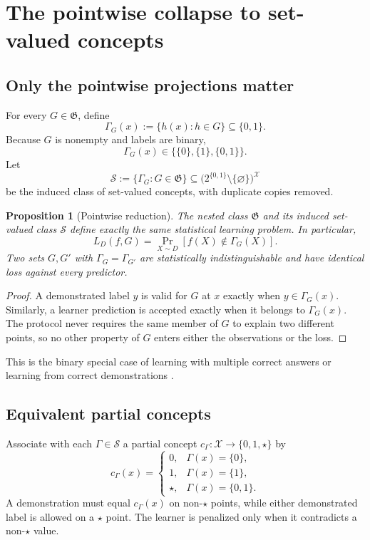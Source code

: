 \documentclass[11pt]{article}
\newtheorem{proposition}[theorem]{Proposition}
\theoremstyle{definition}
\theoremstyle{remark}
\newcommand{\X}{\mathcal X}
\newcommand{\Y}{\{0,1\}}
\newcommand{\Outer}{\mathfrak G}
\newcommand{\SV}{\mathcal S}
\newcommand{\1}{\mathbf 1}
\begin{document}
\section{The pointwise collapse to set-valued concepts}

\subsection{Only the pointwise projections matter}

For every $G\in\Outer$, define
\[
    \Gamma_G(x):=\{h(x):h\in G\}\subseteq\Y.
\]
Because $G$ is nonempty and labels are binary,
\[
    \Gamma_G(x)\in\bigl\{\{0\},\{1\},\{0,1\}\bigr\}.
\]
Let
\[
    \SV:=\{\Gamma_G:G\in\Outer\}
    \subseteq
    \bigl(2^{\Y}\setminus\{\varnothing\}\bigr)^{\X}
\]
be the induced class of set-valued concepts, with duplicate copies removed.

\begin{proposition}[Pointwise reduction]
The nested class $\Outer$ and its induced set-valued class $\SV$ define exactly the same statistical learning problem. In particular,
\[
    L_D(f,G)=\Pr_{X\sim D}[f(X)\notin\Gamma_G(X)].
\]
Two sets $G,G'$ with $\Gamma_G=\Gamma_{G'}$ are statistically indistinguishable and have identical loss against every predictor.
\end{proposition}

\begin{proof}
A demonstrated label $y$ is valid for $G$ at $x$ exactly when $y\in\Gamma_G(x)$. Similarly, a learner prediction is accepted exactly when it belongs to $\Gamma_G(x)$. The protocol never requires the same member of $G$ to explain two different points, so no other property of $G$ enters either the observations or the loss.
\end{proof}

This is the binary special case of learning with multiple correct answers or learning from correct demonstrations \cite{JoshiEtAl2025,PourEtAl2026}.

\subsection{Equivalent partial concepts}

Associate with each $\Gamma\in\SV$ a partial concept $c_\Gamma:\X\to\{0,1,\star\}$ by
\[
    c_\Gamma(x)=
    \begin{cases}
        0,&\Gamma(x)=\{0\},\\
        1,&\Gamma(x)=\{1\},\\
        \star,&\Gamma(x)=\{0,1\}.
    \end{cases}
\]
A demonstration must equal $c_\Gamma(x)$ on non-$\star$ points, while either demonstrated label is allowed on a $\star$ point. The learner is penalized only when it contradicts a non-$\star$ value.
\end{document}
